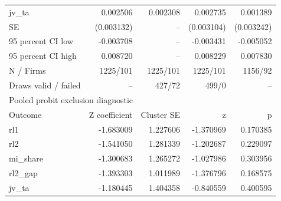 \begin{table}[htbp]
\begin{tabular}{lrrrr}
jv\_ta & 0.002506 & 0.002308 & 0.002735 & 0.001389 \\
SE & (0.003132) & -- & (0.003104) & (0.003242) \\
95 percent CI low & -0.003708 & -- & -0.003431 & -0.005052 \\
95 percent CI high & 0.008720 & -- & 0.008229 & 0.007830 \\
N / Firms & 1225/101 & 1225/101 & 1225/101 & 1156/92 \\
Draws valid / failed & -- & 427/72 & 499/0 & -- \\
\midrule
\multicolumn{5}{l}{Pooled probit exclusion diagnostic} \\
Outcome & Z coefficient & Cluster SE & z & p \\
rl1 & -1.683009 & 1.227606 & -1.370969 & 0.170385 \\
rl2 & -1.541050 & 1.281339 & -1.202687 & 0.229097 \\
mi\_share & -1.300683 & 1.265272 & -1.027986 & 0.303956 \\
rl2\_gap & -1.393303 & 1.011989 & -1.376796 & 0.168575 \\
jv\_ta & -1.180445 & 1.404358 & -0.840559 & 0.400595 \\
\bottomrule
\end{tabular}
\end{table}
\par\smallskip
